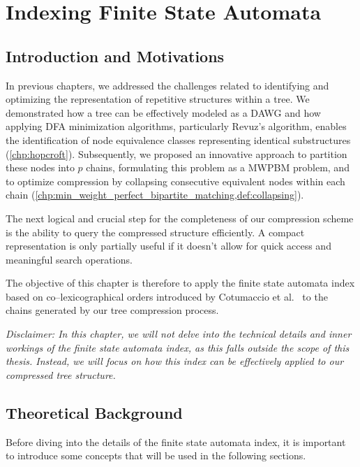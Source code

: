 \chapter{Indexing Finite State Automata} \label{chp:indexing}
\section{Introduction and Motivations}
In previous chapters, we addressed the challenges related to identifying and optimizing the representation of repetitive structures within a tree. We demonstrated how a tree can be effectively modeled as a DAWG and how applying DFA minimization algorithms, particularly Revuz's algorithm, enables the identification of node equivalence classes representing identical substructures (\cref{chp:hopcroft}). Subsequently, we proposed an innovative approach to partition these nodes into $p$ chains, formulating this problem as a MWPBM problem, and to optimize compression by collapsing consecutive equivalent nodes within each chain (\cref{chp:min_weight_perfect_bipartite_matching,def:collapsing}).

The next logical and crucial step for the completeness of our compression scheme is the ability to query the compressed structure efficiently. A compact representation is only partially useful if it doesn't allow for quick access and meaningful search operations.

The objective of this chapter is therefore to apply the finite state automata index based on co--lexicographical orders introduced by Cotumaccio et al.~\cite{cotumaccio2023co} to the chains generated by our tree compression process.

\textit{Disclaimer: In this chapter, we will not delve into the technical details and inner workings of the finite state automata index, as this falls outside the scope of this thesis. Instead, we will focus on how this index can be effectively applied to our compressed tree structure.}

\section{Theoretical Background}
Before diving into the details of the finite state automata index, it is important to introduce some concepts that will be used in the following sections.

